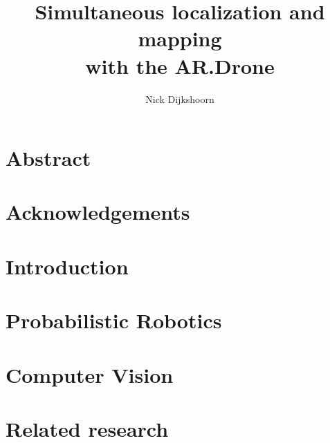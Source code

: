 \documentclass[twoside]{uva-bachelor-thesis}
\title{Simultaneous localization and mapping \\ \vspace{0.5cm} with the AR.Drone}
\author{Nick Dijkshoorn}
\begin{document}
\maketitle





\chapter*{Abstract}




\chapter*{Acknowledgements}




\tableofcontents
\clearpage




\chapter{Introduction}
\label{chapter:introduction}




%


\chapter{Probabilistic Robotics}
\label{chapter:probabilistic-robotics}



\chapter{Computer Vision}
\label{chapter:computer-vision}



\chapter{Related research}
\label{chapter:related-research}

\end{document}
